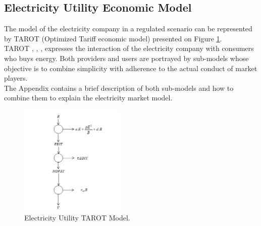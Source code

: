 \documentclass[10pt, letterpaper]{elsarticle}
\begin{document}
\subsection{Electricity Utility Economic Model}
\label{SS:2-2}

The model of the electricity company in a regulated scenario can be represented by TAROT (Optimized Tariff economic model) presented on Figure \ref{Fig4}. \\
TAROT \citet{Arango2010TheMarkets}, \citet{Arango2008AValue}, \citet{Arango2008OOtima}, expresses the interaction of the electricity company with consumers who buys energy. Both providers and users are portrayed by sub-models whose objective is to combine simplicity with adherence to the actual conduct of market players.\\
The Appendix contains a brief description of both sub-models and how to combine them  to explain the electricity market model.\\
\begin{figure}[h]%
\centering
\includegraphics[width = 0.45\textwidth]{Fig4.png} 
\caption{Electricity Utility TAROT Model.}
\label{Fig4}
\end{figure}
\end{document}
